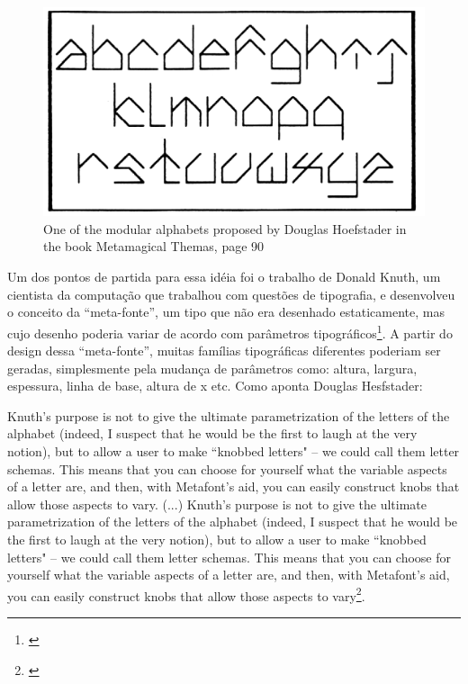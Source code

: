 \begin{figure}[!ht]
    
        \includegraphics[width=1\linewidth]{pictures/metamagical}
        \vspace{-10pt}
    \caption{One of the modular alphabets proposed by Douglas Hoefstader in the book Metamagical Themas, page 90}
    \label{fig:metamagical}
\end{figure} 

Um dos pontos de partida para essa idéia foi o trabalho de Donald Knuth, um cientista da computação que trabalhou com questões de tipografia, e desenvolveu o conceito da ``meta-fonte'', um tipo que não era desenhado estaticamente, mas cujo desenho poderia variar de acordo com parâmetros tipográficos\footnote{\cite{knuth-meta-font_1982}}. A partir do design dessa ``meta-fonte'', muitas famílias tipográficas diferentes poderiam ser geradas, simplesmente pela mudança de parâmetros como: altura, largura, espessura, linha de base, altura de x etc. Como aponta Douglas Hesfstader:

\begin{citacao}
Knuth's purpose is not to give the ultimate parametrization of the letters of the alphabet (indeed, I suspect that he would be the first to laugh at the very notion), but to allow a user to make ``knobbed letters" -- we could call them letter schemas. This means that you can choose for yourself what the variable aspects of a letter are, and then, with Metafont's aid, you can easily construct knobs that allow those aspects to vary. 
(...)
Knuth's purpose is not to give the ultimate parametrization of the letters of the alphabet (indeed, I suspect that he would be the first to laugh at the very notion), but to allow a user to make ``knobbed letters" -- we could call them letter schemas. This means that you can choose for yourself what the variable aspects of a letter are, and then, with Metafont's aid, you can easily construct knobs that allow those aspects to vary\footnote{\cite{Metamagical1986}}. 
\end{citacao}

